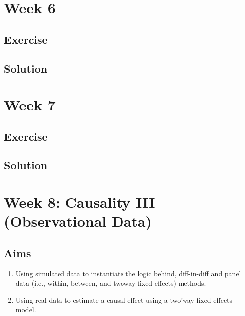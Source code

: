 \documentclass[
]{book}
\providecommand{\tightlist}{%
  \setlength{\itemsep}{0pt}\setlength{\parskip}{0pt}}
\begin{document}
\hypertarget{week-6}{%
\chapter{Week 6}\label{week-6}}

\hypertarget{exercise-2}{%
\section{Exercise}\label{exercise-2}}

\hypertarget{solution-2}{%
\section{Solution}\label{solution-2}}

\hypertarget{week-7}{%
\chapter{Week 7}\label{week-7}}

\hypertarget{exercise-3}{%
\section{Exercise}\label{exercise-3}}

\hypertarget{solution-3}{%
\section{Solution}\label{solution-3}}

\hypertarget{week-8-causality-iii-observational-data}{%
\chapter{Week 8: Causality III (Observational Data)}\label{week-8-causality-iii-observational-data}}

\hypertarget{aims-3}{%
\section{Aims}\label{aims-3}}

\begin{enumerate}
\def\labelenumi{\arabic{enumi}.}
\tightlist
\item
  Using simulated data to instantiate the logic behind, diff-in-diff and panel data (i.e., within, between, and twoway fixed effects) methods.
\item
  Using real data to estimate a causal effect using a two'way fixed effects model.
\end{enumerate}
\end{document}
